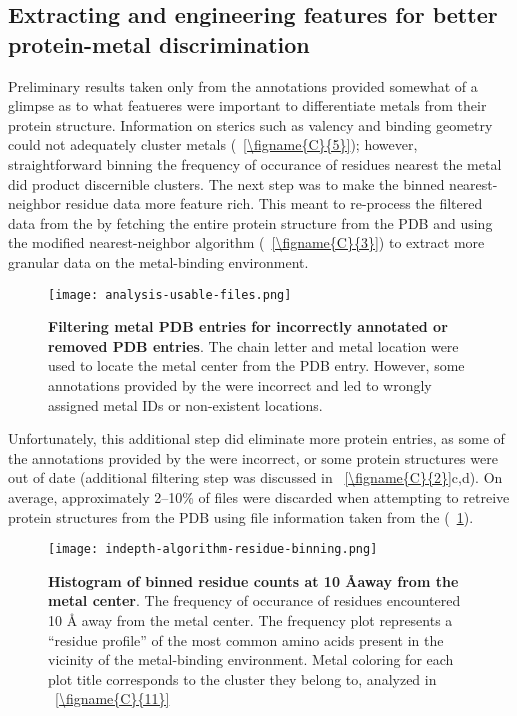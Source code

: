 \documentclass[../main/main]{subfiles}
\begin{document}
\subsection{Extracting and engineering features for better protein-metal discrimination}
\label{subsection:feature-engineering}
Preliminary results taken only from the \mPDB{} annotations provided somewhat of a glimpse as to what featueres were important to differentiate metals from their protein structure. Information on sterics such as valency and binding geometry could not adequately cluster metals (\FIGURE~\ref{\figname{C}{5}}); however, straightforward binning the frequency of occurance of residues nearest the metal did product discernible clusters. The next step was to make the binned nearest-neighbor residue data more feature rich. This meant to re-process the filtered data from the \mPDB{} by fetching the entire protein structure from the PDB and using the modified nearest-neighbor algorithm (\FIGURE~\ref{\figname{C}{3}}) to extract more granular data on the metal-binding environment.

\begin{figure}[H]
	\centering
	\texttt{[image: analysis-usable-files.png]}
	\caption[Filtering metal PDB entries for incorrectly annotated or removed PDB entries]
	{
		\textbf{Filtering metal PDB entries for incorrectly annotated or removed PDB entries}.
		The chain letter and metal location were used to locate the metal center from the PDB entry. However, some annotations provided by the \mPDB{} were incorrect and led to wrongly assigned metal IDs or non-existent locations.
	}
	\label{\figname{C}{7}}
\end{figure}

Unfortunately, this additional step did eliminate more protein entries, as some of the annotations provided by the \mPDB{} were incorrect, or some protein structures were out of date (additional filtering step was discussed in \FIGURE~\ref{\figname{C}{2}}c,d). On average, approximately 2--10\% of files were discarded when attempting to retreive protein structures from the PDB using file information taken from the \mPDB{} (\FIGURE~\ref{\figname{C}{7}}).

\begin{figure}[H]
	\centering
	\texttt{[image: indepth-algorithm-residue-binning.png]}
	\caption[Histogram of binned residue counts at 10 \AA away from the metal center]
	{
		\textbf{Histogram of binned residue counts at 10 \AA away from the metal center}.
		The frequency of occurance of residues encountered 10 \AA{} away from the metal center. The frequency plot represents a ``residue profile'' of the most common amino acids present in the vicinity of the metal-binding environment. Metal coloring for each plot title corresponds to the cluster they belong to, analyzed in \FIGURE~\ref{\figname{C}{11}}
	}
	\label{\figname{C}{8}}
\end{figure}
\end{document}
